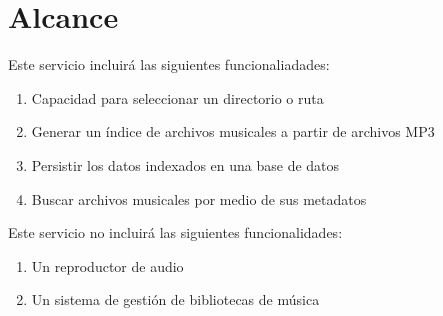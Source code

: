 
\section*{Alcance}

\noindent Este servicio incluirá las siguientes funcionaliadades: 
\begin{enumerate}
  \item Capacidad para seleccionar un directorio o ruta
  \item Generar un índice de archivos musicales a partir de archivos MP3
  \item Persistir los datos indexados en una base de datos
  \item Buscar archivos musicales por medio de sus metadatos
\end{enumerate}

\noindent Este servicio no incluirá las siguientes funcionalidades:
\begin{enumerate}
  \item Un reproductor de audio
  \item Un sistema de gestión de bibliotecas de música
\end{enumerate}


